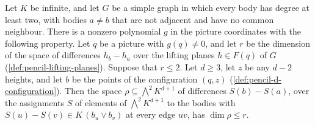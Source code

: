 \begin{lemma}
  \label{lem:pencil-d-glued-ends}
  \leanok
  Let $K$ be infinite, and let $G$ be a simple graph in which every body
  has degree at least two, with bodies $a \neq b$ that are not adjacent
  and have no common neighbour. There is a nonzero polynomial $g$ in the
  picture coordinates with the following property. Let $q$ be a picture
  with $g(q) \neq 0$, and let $r$ be the dimension of the space of
  differences $h_b - h_a$ over the lifting planes $h \in F(q)$ of $G$
  (\cref{def:pencil-lifting-planes}). Suppose that $r \le 2$. Let
  $d \ge 3$, let $z$ be any $d - 2$ heights, and let $b$ be the points of
  the configuration $(q, z)$ (\cref{def:pencil-d-configuration}). Then the
  space $\rho \subseteq \bigwedge^2 K^{d+1}$ of differences $S(b) - S(a)$,
  over the assignments $S$ of elements of $\bigwedge^2 K^{d+1}$ to the
  bodies with $S(u) - S(v) \in K\,(b_u \vee b_v)$ at every edge $uv$, has
  $\dim \rho \le r$.
\end{lemma}

